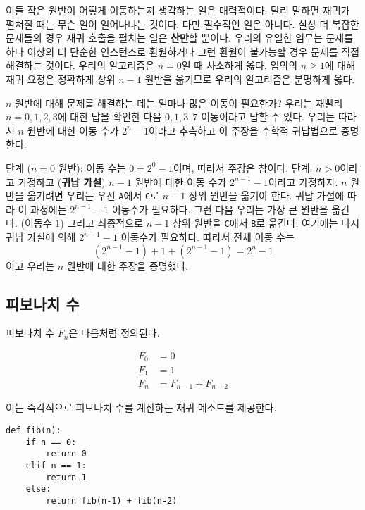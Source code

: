 \documentclass[a4paper]{oblivoir}
\begin{document}
이들 작은 원반이 어떻게 이동하는지 생각하는 일은 매력적이다. 달리 말하면 재귀가 펼쳐질 때는 무슨 일이 일어나냐는 것이다. 다만 필수적인 일은 아니다. 실상 더 복잡한 문제들의 경우 재귀 호출을 펼치는 일은 \textbf{산만}할 뿐이다. 우리의 유일한 임무는 문제를 하나 이상의 더 단순한 인스턴스로 환원하거나 그런 환원이 불가능할 경우 문제를 직접 해결하는 것이다. 우리의 알고리즘은 $n=0$일 때 사소하게 옳다. 임의의 $n\geq 1$에 대해 재귀 요정은 정확하게 상위 $n-1$ 원반을 옮기므로 우리의 알고리즘은 분명하게 옳다.

$n$ 원반에 대해 문제를 해결하는 데는 얼마나 많은 이동이 필요한가? 우리는 재빨리 $n=0,1,2,3$에 대한 답을 확인한 다음 $0,1,3,7$ 이동이라고 답할 수 있다. 우리는 따라서 $n$ 원반에 대한 이동 수가 $2^n-1$이라고 추측하고 이 주장을 수학적 귀납법으로 증명한다.

\begin{itemize}
     단계 ($n=0$ 원반): 이동 수는 $0=2^0-1$이며, 따라서 주장은 참이다.
     단계: $n>0$이라고 가정하고 (\textbf{귀납 가설}) $n-1$ 원반에 대한 이동 수가 $2^{n-1}-1$이라고 가정하자. $n$ 원반을 옮기려면 우리는 우선 \texttt{A}에서 \texttt{C}로 $n-1$ 상위 원반을 옮겨야 한다. 귀납 가설에 따라 이 과정에는 $2^{n-1}-1$ 이동수가 필요하다. 그런 다음 우리는 가장 큰 원반을 옮긴다. (이동수 $1$) 그리고 최종적으로 $n-1$ 상위 원반을 \texttt{C}에서 \texttt{B}로 옮긴다. 여기에는 다시 귀납 가설에 의해 $2^{n-1}-1$ 이동수가 필요하다. 따라서 전체 이동 수는 $$(2^{n-1}-1)+1+(2^{n-1}-1)=2^n-1$$이고 우리는 $n$ 원반에 대한 주장을 증명했다.
\end{itemize}

\subsection*{피보나치 수}
피보나치 수 $F_n$은 다음처럼 정의된다.

$$\begin{aligned}F_0&=0\\ 
F_1&=1\\ 
F_n&=F_{n-1}+F_{n-2}\end{aligned}$$

이는 즉각적으로 피보나치 수를 계산하는 재귀 메소드를 제공한다.

\begin{verbatim}
def fib(n):
	if n == 0:
		return 0
	elif n == 1:
		return 1
	else:
		return fib(n-1) + fib(n-2)
\end{verbatim}
\end{document}
